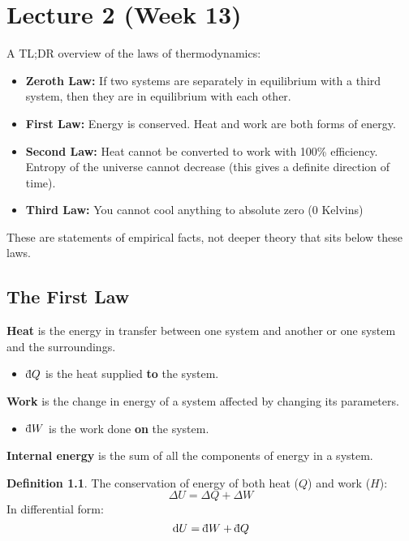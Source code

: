 \documentclass[12pt,chapterprefix=false,dvipsnames]{scrbook}
\theoremstyle{dotless}
\theoremstyle{definition}
\newtheorem{protodefinition}{Definition}[section]
\newenvironment{definition}
{\colorlet{shadecolor}{black!15}\begin{shaded}\begin{protodefinition}}
			{\end{protodefinition}\end{shaded}}
\def\dbar{{\mathchar'26\mkern-10mu \mathrm{d}}}
\begin{document}
\chapter{Lecture 2 (Week 13)}%
\label{cha:lecture_2}

A TL;DR overview of the laws of thermodynamics:
\begin{itemize}
	\item \textbf{Zeroth Law:} If two systems are separately in
	      equilibrium with a third system, then they are in equilibrium
	      with each other.
	\item \textbf{First Law:} Energy is conserved. Heat and work are
	      both forms of energy.
	\item \textbf{Second Law:} Heat cannot be converted to work with
	      100\% efficiency. Entropy of the universe cannot decrease (this
	      gives a definite direction of time).
	\item \textbf{Third Law:} You cannot cool anything to absolute zero
	      (0 Kelvins)
\end{itemize}

These are statements of empirical facts, not deeper theory that
sits below these laws.

\section{The First Law}%
\label{sec:the_first_law}

\textbf{Heat} is the energy in transfer between one
system and another or one system and the surroundings.
\begin{itemize}
	\item $\dbar Q$ is the heat supplied
	      \textbf{to} the system.
\end{itemize}

\textbf{Work} is the change in energy of a system
affected by changing its parameters.
\begin{itemize}
	\item $\dbar W$ is
	      the work done \textbf{on} the system.
\end{itemize}

\textbf{Internal energy} is the sum of all the components of
energy in a system.

\begin{definition}
	The conservation of energy of both heat ($Q$)
	and work ($H$):
	\begin{equation}
		\label{eq:first_law}
		\Delta U = \Delta Q + \Delta W
	\end{equation}
	In differential form:
	\begin{equation}
		\dd{U}
		=
		\dbar W + \dbar Q
	\end{equation}
\end{definition}
\end{document}
